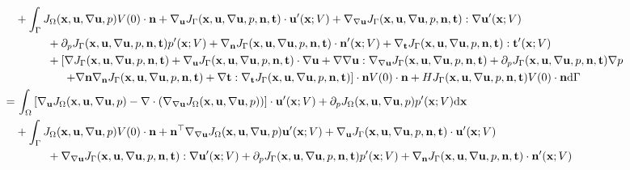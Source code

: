 \documentclass[oneside,11pt]{book}
\numberwithin{equation}{section}
\begin{document}
\begin{enumerate}[leftmargin=0in]
\begin{align*}
        &+ \int_\Gamma J_\Omega({\bf x},{\bf u},\nabla{\bf u},p)V(0)\cdot{\bf n} + \nabla_{\bf u}J_\Gamma({\bf x},{\bf u},\nabla{\bf u},p,{\bf n},{\bf t})\cdot{\bf u}'({\bf x};V) + \nabla_{\nabla{\bf u}}J_\Gamma({\bf x},{\bf u},\nabla{\bf u},p,{\bf n},{\bf t}):\nabla{\bf u}'({\bf x};V)\\
        &\hspace{1cm}+ \partial_pJ_\Gamma({\bf x},{\bf u},\nabla{\bf u},p,{\bf n},{\bf t})p'({\bf x};V) + \nabla_{\bf n}J_\Gamma({\bf x},{\bf u},\nabla{\bf u},p,{\bf n},{\bf t})\cdot{\bf n}'({\bf x};V) + \nabla_{\bf t}J_\Gamma({\bf x},{\bf u},\nabla{\bf u},p,{\bf n},{\bf t}):{\bf t}'({\bf x};V)\\
        &\hspace{1cm}+ \left[\nabla J_\Gamma({\bf x},{\bf u},\nabla{\bf u},p,{\bf n},{\bf t}) + \nabla_{\bf u}J_\Gamma({\bf x},{\bf u},\nabla{\bf u},p,{\bf n},{\bf t})\cdot\nabla{\bf u} + \nabla\nabla{\bf u}:\nabla_{\nabla{\bf u}}J_\Gamma({\bf x},{\bf u},\nabla{\bf u},p,{\bf n},{\bf t}) + \partial_pJ_\Gamma({\bf x},{\bf u},\nabla{\bf u},p,{\bf n},{\bf t})\nabla p\right.\\
        &\hspace{15mm} \left.+ \nabla{\bf n}\nabla_{\bf n}J_\Gamma({\bf x},{\bf u},\nabla{\bf u},p,{\bf n},{\bf t}) + \nabla{\bf t}:\nabla_{\bf t}J_\Gamma({\bf x},{\bf u},\nabla{\bf u},p,{\bf n},{\bf t})\right]\cdot{\bf n}V(0)\cdot{\bf n} + HJ_\Gamma({\bf x},{\bf u},\nabla{\bf u},p,{\bf n},{\bf t})V(0)\cdot{\bf n}{\rm d}\Gamma\\
        =&\, \int_\Omega \left[\nabla_{\bf u}J_\Omega({\bf x},{\bf u},\nabla{\bf u},p) - \nabla\cdot(\nabla_{\nabla{\bf u}}J_\Omega({\bf x},{\bf u},\nabla{\bf u},p))\right]\cdot{\bf u}'({\bf x};V) + \partial_pJ_\Omega({\bf x},{\bf u},\nabla{\bf u},p)p'({\bf x};V){\rm d}{\bf x}\\
        &+ \int_\Gamma J_\Omega({\bf x},{\bf u},\nabla{\bf u},p)V(0)\cdot{\bf n} + {\bf n}^\top\nabla_{\nabla{\bf u}}J_\Omega({\bf x},{\bf u},\nabla{\bf u},p){\bf u}'({\bf x};V) + \nabla_{\bf u}J_\Gamma({\bf x},{\bf u},\nabla{\bf u},p,{\bf n},{\bf t})\cdot{\bf u}'({\bf x};V)\\
        &\hspace{1cm}+ \nabla_{\nabla{\bf u}}J_\Gamma({\bf x},{\bf u},\nabla{\bf u},p,{\bf n},{\bf t}):\nabla{\bf u}'({\bf x};V) + \partial_pJ_\Gamma({\bf x},{\bf u},\nabla{\bf u},p,{\bf n},{\bf t})p'({\bf x};V) + \nabla_{\bf n}J_\Gamma({\bf x},{\bf u},\nabla{\bf u},p,{\bf n},{\bf t})\cdot{\bf n}'({\bf x};V)\\

\end{align*}
\end{enumerate}
\end{document}
